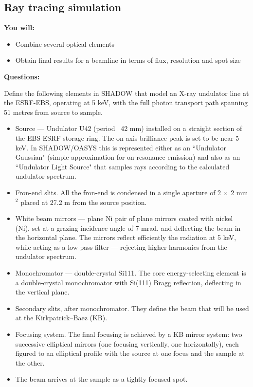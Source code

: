 
\subsection{Ray tracing simulation}

\begin{youwillbox}
\textbf{You will:}

\begin{itemize}
    \item Combine several optical elements
    \item Obtain final results for a beamline in terms of flux, resolution and spot size
\end{itemize}
\end{youwillbox}

\begin{questionsbox}
\textbf{Questions:}

Define the following elements in SHADOW that model an X-ray undulator line at the ESRF-EBS, operating at 5 keV, with the full photon transport path spanning 51 metres from source to sample.

\begin{itemize}
    \item Source --- Undulator U42 (period ~42 mm) installed on a straight section of the EBS-ESRF storage ring. The on-axis brilliance peak is set to be near 5 keV.
    In SHADOW/OASYS this is represented either as an ``Undulator Gaussian" (simple approximation for on-resonance emission) and also as an ``Undulator Light Source" that samples rays according to the calculated undulator spectrum.
    \item Fron-end slits. All the fron-end is condensed in a single aperture of 2 $\times$ 2 mm$^2$ placed at 27.2 m from the source position.
    \item White beam mirrors --- plane Ni pair of plane mirrors coated with nickel (Ni), set at a grazing incidence angle of 7 mrad. and deflecting the beam in the horizontal plane. The mirrors reflect efficiently the radiation at 5 keV, while acting as a low-pass filter --- rejecting higher harmonics from the undulator spectrum.
    \item Monochromator --- double-crystal Si111. The core energy-selecting element is a double-crystal monochromator with Si(111) Bragg reflection, deflecting in the vertical plane.
    \item Secondary slits, after monochromator. They define the beam that will be used at the Kirkpatrick--Baez (KB).
    \item Focusing system. The final focusing is achieved by a KB mirror system: two successive elliptical mirrors (one focusing vertically, one horizontally), each figured to an elliptical profile with the source at one focus and the sample at the other.
    \item The beam arrives at the sample as a tightly focused spot.
\end{itemize}


\end{questionsbox}
